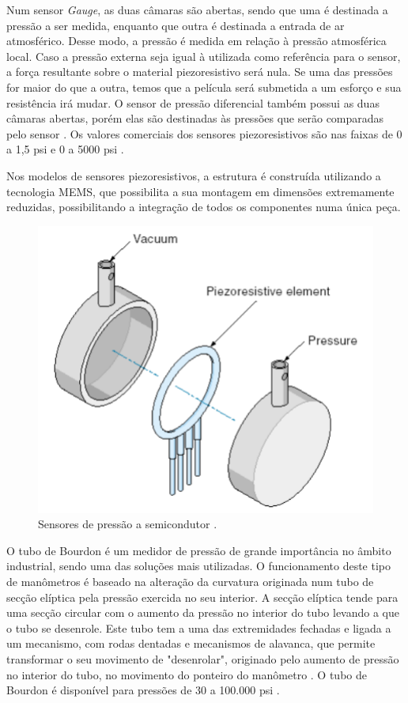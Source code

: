 \begin{anexosenv}
Num sensor \textit{Gauge}, as duas câmaras são abertas, sendo que uma é destinada a pressão a ser medida, enquanto que outra é destinada a entrada de ar atmosférico. Desse modo, a pressão é medida em relação à pressão atmosférica local. Caso a pressão externa seja igual à utilizada como referência para o sensor, a força resultante sobre o material piezoresistivo será nula. Se uma das pressões for maior do que a outra, temos que a película será submetida a um esforço e sua resistência irá mudar. O sensor de pressão diferencial também possui as duas câmaras abertas, porém elas são destinadas às pressões que serão comparadas pelo sensor \cite{patsko}. Os valores comerciais dos sensores piezoresistivos são nas faixas de 0 a 1,5 psi e 0 a 5000 psi \cite{geomar}.

Nos modelos de sensores piezoresistivos, a estrutura é construída utilizando a tecnologia MEMS, que possibilita a sua montagem em dimensões extremamente reduzidas, possibilitando a integração de todos os componentes numa única peça.

\begin{figure}[htb]
		\centering
			\includegraphics[scale=0.7]{figuras/sensorpressao.png}
		\caption{Sensores de pressão a semicondutor \cite{geomar}.}
		\label{fig16}
\end{figure}

O tubo de Bourdon é um medidor de pressão de grande importância no âmbito industrial, sendo uma das soluções mais utilizadas. O funcionamento deste tipo de manômetros é baseado na alteração da curvatura originada num tubo de secção elíptica pela pressão exercida no seu interior. A secção elíptica tende para uma secção circular com o aumento da pressão no interior do tubo levando a que o tubo se desenrole. Este tubo tem a uma das extremidades fechadas e ligada a um mecanismo, com rodas dentadas e mecanismos de alavanca, que permite transformar o seu movimento de "desenrolar", originado pelo aumento de pressão no interior do tubo, no movimento do ponteiro do manômetro \cite{bourdon}. O tubo de Bourdon é disponível para pressões de 30 a 100.000 psi \cite{geomar}.


\end{anexosenv}
